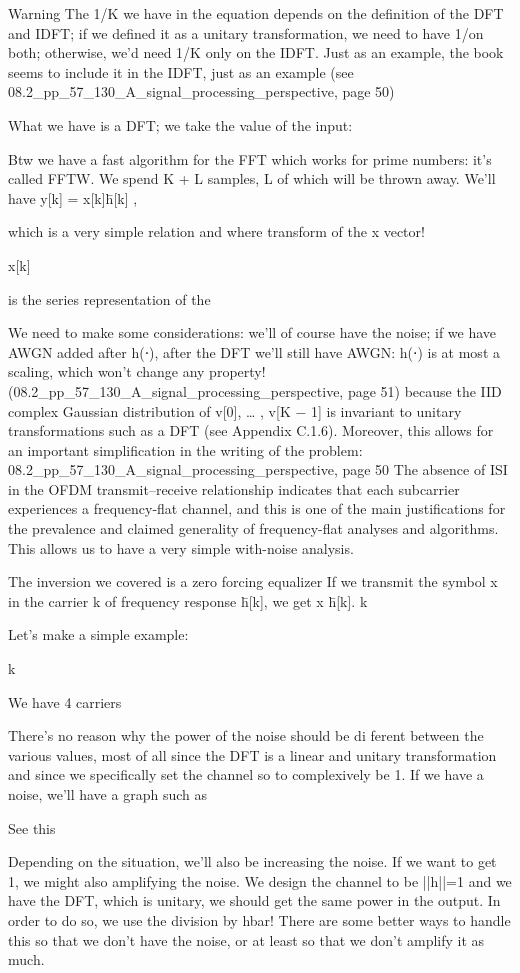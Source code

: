 {Warning The 1/K we have in the equation depends on the definition of the DFT and IDFT; if we defined it as a unitary transformation, we need to have 1/\sqrtK on both; otherwise,
we'd need 1/K only on the IDFT.
Just as an example, the book seems to include it in the IDFT, just as an example
(see 08.2_pp_57_130_A_signal_processing_perspective, page 50)

What we have is a DFT; we take the value of the input:

Btw we have a fast algorithm for the FFT which works for prime numbers: it's called FFTW.
We spend K + L samples, L of which will be thrown away.
We'll have y[k] = x[k]h̄[k] ,

which is a very simple relation and where transform of the x vector!

x[k]

is the series representation of the

We need to make some considerations: we'll of course have the noise; if we have AWGN added after h(⋅), after the DFT we'll still have AWGN: h(⋅) is at most a scaling, which won't change any property!
(08.2_pp_57_130_A_signal_processing_perspective, page 51)
because the IID complex Gaussian distribution of v[0], … , v[K − 1] is invariant to unitary transformations such as a DFT (see Appendix C.1.6).
Moreover, this allows for an important simplification in the writing of the problem:
08.2_pp_57_130_A_signal_processing_perspective, page 50 The absence of ISI in the OFDM transmit–receive relationship indicates that each subcarrier experiences a frequency-flat channel, and this is one of the main justifications for the prevalence and claimed generality of frequency-flat analyses and algorithms.
This allows us to have a very simple with-noise analysis.

The inversion we covered is a zero forcing equalizer If we transmit the symbol x in the carrier k of frequency response h̄[k], we get x h̄[k].
k

Let's make a simple example:

k

We have 4 carriers

There's no reason why the power of the noise should be di ferent between the various values, most of all since the DFT is a linear and unitary transformation and since we specifically set the channel so to complexively be 1.
If we have a noise, we'll have a graph such as

See this

Depending on the situation, we'll also be increasing the noise.
If we want to get 1, we might also amplifying the noise.
We design the channel to be ||h||=1 and we have the DFT, which is unitary, we should get the same power in the output.
In order to do so, we use the division by hbar!
There are some better ways to handle this so that we don't have the noise, or at least so that we don't amplify it as much.

}
